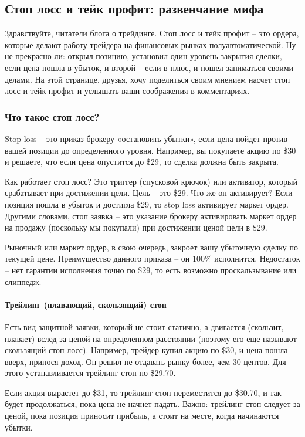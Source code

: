 \documentclass[a5paper]{article}
\begin{document}
\subsection{Стоп лосс и тейк профит: развенчание мифа}

Здравствуйте, читатели блога о трейдинге. Стоп лосс и тейк профит –
это ордера, которые делают работу трейдера на финансовых рынках
полуавтоматической. Ну не прекрасно ли: открыл позицию, установил один
уровень закрытия сделки, если цена пошла в убыток, и второй – если в
плюс, и пошел заниматься своими делами. На этой странице, друзья, хочу
поделиться своим мнением насчет стоп лосс и тейк профит и услышать
ваши соображения в комментариях.

\subsubsection{Что такое стоп лосс?}

Stop loss – это приказ брокеру «остановить убытки», если цена пойдет против вашей позиции до определенного уровня. Например, вы покупаете акцию по \$30 и решаете, что если цена опустится до \$29, то сделка должна быть закрыта.

Как работает стоп лосс? Это триггер (спусковой крючок) или активатор, который срабатывает при достижении цели. Цель – это \$29. Что же он активирует? Если позиция пошла в убыток и достигла \$29, то stop loss активирует маркет ордер. Другими словами, стоп заявка – это указание брокеру активировать маркет ордер на продажу (поскольку мы покупали) при достижении ценой цели в \$29.

Рыночный или маркет ордер, в свою очередь, закроет вашу убыточную
сделку по текущей цене. Преимущество данного приказа – он 100\%
исполнится. Недостаток – нет гарантии исполнения точно по \$29, то
есть возможно проскальзывание или слиппедж.

\paragraph{Трейлинг (плавающий, скользящий) стоп}

Есть вид защитной заявки, который не стоит статично, а двигается (скользит, плавает) вслед за ценой на определенном расстоянии (поэтому его еще называют скользящий стоп лосс). Например, трейдер купил акцию по \$30, и цена пошла вверх, принося доход. Он решил не отдавать рынку более, чем 30 центов. Для этого устанавливается трейлинг стоп по \$29.70.

Если акция вырастет до \$31, то трейлинг стоп переместится до \$30.70,
и так будет продолжаться, пока цена не начнет падать. Важно: трейлинг
стоп следует за ценой, пока позиция приносит прибыль, а стоит на
месте, когда начинаются убытки.
\end{document}
